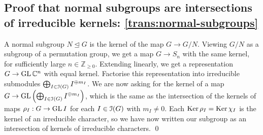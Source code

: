 \subsection{Proof that normal subgroups are intersections of irreducible kernels: \ref{trans:normal-subgroups}} %
\pan A normal subgroup $N \trianglelefteq G$ is the kernel of the map $G \to G / N$. Viewing $G / N$ as a subgroup of a permutation group, we get a map $G \to S_n$ with the same kernel, for sufficiently large $n \in \mathbb{Z}_{\geq 0}$. Extending linearly, we get a representation $G \to \operatorname{GL} \mathbb{C}^n$ with equal kernel. Factorise this representation into irreducible submodules $\bigoplus_{I \in \operatorname{\mathcal{I}}(G)} I^{\oplus m_I}$. We are now asking for the kernel of a map $G \to \operatorname{GL}\left( \bigoplus_{I \in \operatorname{\mathcal{I}}(G)} I^{\oplus m_I} \right)$, which is the same as the intersection of the kernels of maps $\rho_I : G \to \operatorname{GL} I$ for each $I \in \operatorname{\mathcal{I}}(G)$ with $m_I \neq 0$. Each $\operatorname{Ker} \rho_I = \operatorname{Ker} \chi_I$ is the kernel of an irreducible character, so we have now written our subgroup as an intersection of kernels of irreducible characters. \qed

